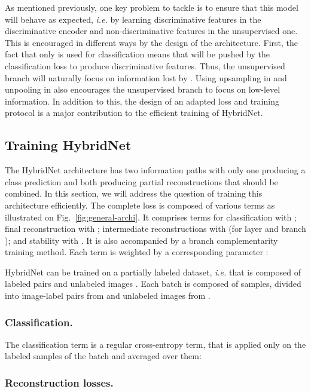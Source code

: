 \documentclass[runningheads]{llncs}
\begin{document}
As mentioned previously, one key problem to tackle is to ensure that this model will behave as expected, \textit{i.e.} by learning discriminative features in the discriminative encoder and non-discriminative features in the unsupervised one.
This is encouraged in different ways by the design of the architecture. First, the fact that only  is used for classification means that  will be pushed by the classification loss to produce discriminative features. Thus, the unsupervised branch will naturally focus on information lost by . Using upsampling in  and unpooling in  also encourages the unsupervised branch to focus on low-level information. In addition to this, the design of an adapted loss and training protocol is a major contribution to the efficient training of HybridNet.

\subsection{Training HybridNet}
\label{sec:training}

The HybridNet architecture has two information paths with only one producing a class prediction and both producing partial reconstructions that should be combined. In this section, we will address the question of training this architecture efficiently. The complete loss is composed of various terms as illustrated on Fig.~\ref{fig:general-archi}. It comprises terms for classification with ; final reconstruction with ; intermediate reconstructions with  (for layer  and branch ); and stability with . It is also accompanied by a branch complementarity training method. Each term is weighted by a corresponding parameter :


HybridNet can be trained on a partially labeled dataset, \textit{i.e.} that is composed of labeled pairs  and unlabeled images .
Each batch is composed of  samples, divided into  image-label pairs from  and  unlabeled images from .

\subsubsection{Classification.}

The classification term is a regular cross-entropy term, that is applied only on the  labeled samples of the batch and averaged over them:


\subsubsection{Reconstruction losses.}
\end{document}
